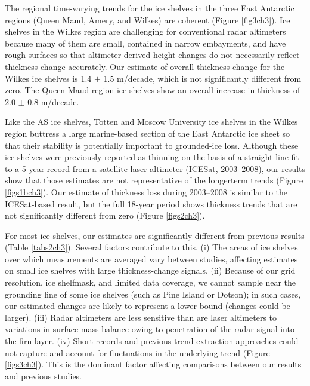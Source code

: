 The regional time-varying trends for the ice
shelves in the three East Antarctic regions (Queen
Maud, Amery, and Wilkes) are coherent (Figure \ref{fig3ch3}).
Ice shelves in the Wilkes region are challenging
for conventional radar altimeters because many
of them are small, contained in narrow embayments,
and have rough surfaces so that altimeter-derived
height changes do not necessarily reflect
thickness change accurately. Our estimate of overall
thickness change for the Wilkes ice shelves is
1.4 $\pm$ 1.5 m/decade, which is not significantly
different from zero. The Queen Maud region ice
shelves show an overall increase in thickness of
2.0 $\pm$ 0.8 m/decade.

Like the AS ice shelves, Totten and Moscow
University ice shelves in the Wilkes region buttress
a large marine-based section of the East
Antarctic ice sheet so that their stability is potentially
important to grounded-ice loss. Although
these ice shelves were previously reported as
thinning \parencite{Pritchard2012} on the basis of a straight-line fit to
a 5-year record from a satellite laser altimeter
(ICESat, 2003--2008), our results show that those
estimates are not representative of the longerterm
trends (Figure \ref{figs1bch3}). Our estimate of thickness
loss during 2003--2008 is similar to the ICESat-based
result, but the full 18-year period shows
thickness trends that are not significantly different
from zero (Figure \ref{figs2ch3}).

For most ice shelves, our estimates are significantly
different from previous results (Table \ref{tabs2ch3}).
Several factors contribute to this. (i) The areas of
ice shelves over which measurements are averaged
vary between studies, affecting estimates on
small ice shelves with large thickness-change
signals. (ii) Because of our grid resolution, ice
shelfmask, and limited data coverage, we cannot
sample near the grounding line of some ice shelves
(such as Pine Island or Dotson); in such cases,
our estimated changes are likely to represent a
lower bound (changes could be larger). (iii) Radar
altimeters are less sensitive than are laser altimeters
to variations in surface mass balance owing
to penetration of the radar signal into the firn
layer. (iv) Short records and previous trend-extraction
approaches could not capture and account
for fluctuations in the underlying trend (Figure \ref{figs3ch3}).
This is the dominant factor affecting comparisons
between our results and previous studies.

